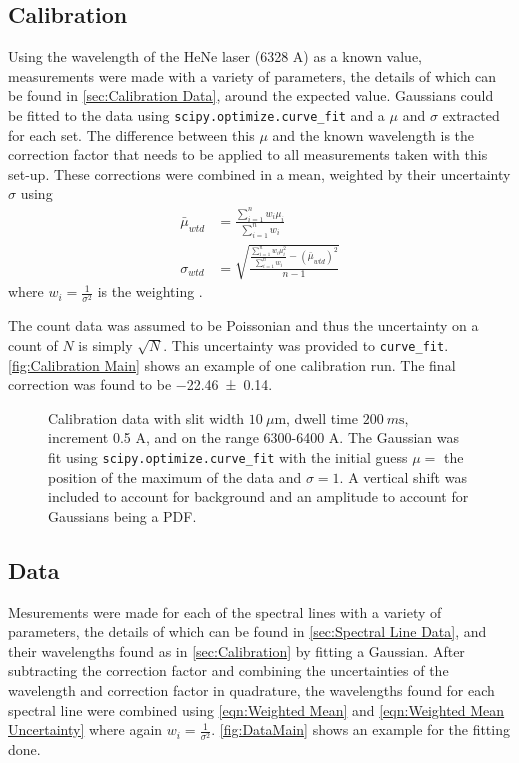 \documentclass[11pt]{article}
\numberwithin{equation}{section}
\numberwithin{figure}{section}
\numberwithin{table}{section}
\begin{document}
\subsection{Calibration}\label{sec:Calibration}
\par Using the wavelength of the HeNe laser (6328 A) as a known value, measurements were made with a variety of parameters, the details of which can be found in \autoref{sec:Calibration Data}, around the expected value. Gaussians could be fitted to the data using \texttt{scipy.optimize.curve\_fit} and a $\mu$ and $\sigma$ extracted for each set. The difference between this $\mu$ and the known wavelength is the correction factor that needs to be applied to all measurements taken with this set-up. These corrections were combined in a mean, weighted by their uncertainty $\sigma$ using
\begin{align}
    \bar \mu_{wtd}&=\frac{\sum\limits_{i=1}^nw_i\mu_i}{\sum\limits_{i=1}^nw_i}\label{eqn:Weighted Mean}\\
    \sigma_{wtd}&=\sqrt{\frac{\frac{\sum\limits_{i=1}^nw_i\mu_i^2}{\sum\limits_{i=1}^nw_i}-(\bar\mu_{wtd})^2}{n-1}}\label{eqn:Weighted Mean Uncertainty}
\end{align}
where $w_i=\frac{1}{\sigma^2}$ is the weighting \cite{Data Reduction}. 
\par The count data was assumed to be Poissonian and thus the uncertainty on a count of $N$ is simply $\sqrt{N}$. This uncertainty was provided to \texttt{curve\_fit}. \autoref{fig:Calibration Main} shows an example of one calibration run. The final correction was found to be \num{-22.46\pm0.14}.

\begin{figure}[h]
    \begin{center}
       \caption{Calibration data with slit width $\SI{10}{\mu\m}$, dwell time $\SI{200}{m\second}$, increment 0.5 A, and on the range 6300-6400 A. The Gaussian was fit using \texttt{scipy.optimize.curve\_fit} with the initial guess $\mu=$ the position of the maximum of the data and $\sigma=1$. A vertical shift was included to account for background and an amplitude to account for Gaussians being a PDF.}
       \label{fig:Calibration Main}
    \end{center}
\end{figure}

\subsection{Data}\label{sec:Data}
\par Mesurements were made for each of the spectral lines with a variety of parameters, the details of which can be found in \autoref{sec:Spectral Line Data}, and their wavelengths found as in \autoref{sec:Calibration} by fitting a Gaussian. After subtracting the correction factor and combining the uncertainties of the wavelength and correction factor in quadrature, the wavelengths found for each spectral line were combined using \autoref{eqn:Weighted Mean} and \autoref{eqn:Weighted Mean Uncertainty} where again $w_i=\frac{1}{\sigma^2}$. \autoref{fig:DataMain} shows an example for the fitting done.
\end{document}
